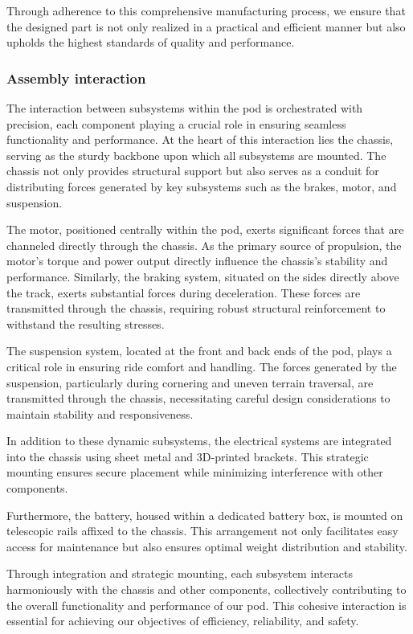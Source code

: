 Through adherence to this comprehensive manufacturing process, we ensure that the designed part is not only realized in a practical and efficient manner but also upholds the highest standards of quality and performance.

\subsubsection{Assembly interaction}


The interaction between subsystems within the pod is orchestrated with precision, each component playing a crucial role in ensuring seamless functionality and performance. At the heart of this interaction lies the chassis, serving as the sturdy backbone upon which all subsystems are mounted. The chassis not only provides structural support but also serves as a conduit for distributing forces generated by key subsystems such as the brakes, motor, and suspension.

The motor, positioned centrally within the pod, exerts significant forces that are channeled directly through the chassis. As the primary source of propulsion, the motor's torque and power output directly influence the chassis's stability and performance. Similarly, the braking system, situated on the sides directly above the track, exerts substantial forces during deceleration. These forces are transmitted through the chassis, requiring robust structural reinforcement to withstand the resulting stresses.

The suspension system, located at the front and back ends of the pod, plays a critical role in ensuring ride comfort and handling. The forces generated by the suspension, particularly during cornering and uneven terrain traversal, are transmitted through the chassis, necessitating careful design considerations to maintain stability and responsiveness.

In addition to these dynamic subsystems, the electrical systems are integrated into the chassis using sheet metal and 3D-printed brackets. This strategic mounting ensures secure placement while minimizing interference with other components.

Furthermore, the battery, housed within a dedicated battery box, is mounted on telescopic rails affixed to the chassis. This arrangement not only facilitates easy access for maintenance but also ensures optimal weight distribution and stability.

Through integration and strategic mounting, each subsystem interacts harmoniously with the chassis and other components, collectively contributing to the overall functionality and performance of our pod. This cohesive interaction is essential for achieving our objectives of efficiency, reliability, and safety.




